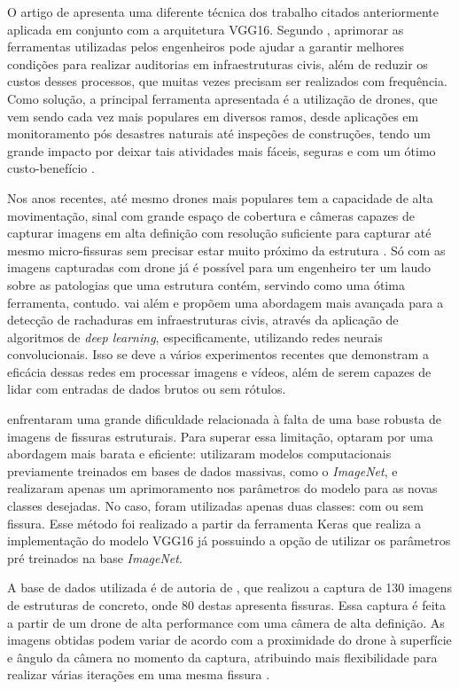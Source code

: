 O artigo de  apresenta uma diferente técnica dos trabalho citados anteriormente aplicada em conjunto com a arquitetura VGG16. 
Segundo , aprimorar as ferramentas utilizadas pelos engenheiros pode ajudar a garantir melhores condições para realizar auditorias em infraestruturas civis, além de reduzir os custos desses processos, que muitas vezes precisam ser realizados com frequência.
Como solução, a principal ferramenta apresentada é a utilização de drones, que vem sendo cada vez mais populares em diversos ramos, desde aplicações em monitoramento pós desastres naturais até inspeções de construções, tendo um grande impacto por deixar tais atividades mais fáceis, seguras e com um ótimo custo-benefício \cite{vidyadharan2017civil}.

Nos anos recentes, até mesmo drones mais populares tem a capacidade de alta movimentação, sinal com grande espaço de cobertura e câmeras capazes de capturar imagens em alta definição com resolução suficiente para capturar até mesmo micro-fissuras sem precisar estar muito próximo da estrutura \cite{gopalakrishnan2018crack}. 
Só com as imagens capturadas com drone já é possível para um engenheiro ter um laudo sobre as patologias que uma estrutura contém, servindo como uma ótima ferramenta, contudo. 
 vai além e propõem uma abordagem mais avançada para a detecção de rachaduras em infraestruturas civis, através da aplicação de algoritmos de \textit{deep learning}, especificamente, utilizando redes neurais convolucionais. 
Isso se deve a vários experimentos recentes que demonstram a eficácia dessas redes em processar imagens e vídeos, além de serem capazes de lidar com entradas de dados brutos ou sem rótulos.

\cite{gopalakrishnan2018crack} enfrentaram uma grande dificuldade relacionada à falta de uma base robusta de imagens de fissuras estruturais. 
Para superar essa limitação, optaram por uma abordagem mais barata e eficiente: utilizaram modelos computacionais previamente treinados em bases de dados massivas, como o \textit{ImageNet}, e realizaram apenas um aprimoramento nos parâmetros do modelo para as novas classes desejadas. 
No caso, foram utilizadas apenas duas classes: com ou sem fissura.
Esse método foi realizado a partir da ferramenta Keras \cite{chollet2015keras} que realiza a implementação do modelo VGG16 já possuindo a opção de utilizar os parâmetros pré treinados na base \textit{ImageNet}.

A base de dados utilizada é de autoria de \cite{gopalakrishnan2018crack}, que realizou a captura de 130 imagens de estruturas de concreto, onde 80 destas apresenta fissuras.
Essa captura é feita a partir de um drone de alta performance com uma câmera de alta definição. 
As imagens obtidas podem variar de acordo com a proximidade do drone à superfície e ângulo da câmera no momento da captura, atribuindo mais flexibilidade para realizar várias iterações em uma mesma fissura \cite{gopalakrishnan2018crack}.

